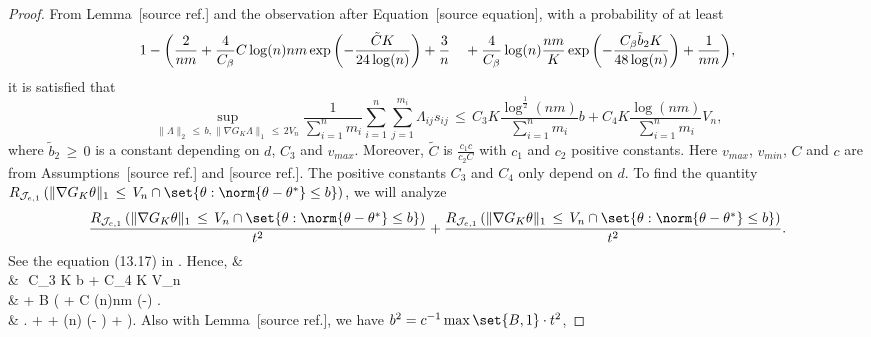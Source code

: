 \documentclass[twoside,11pt]{article}
\makeatletter
\newcommand{\discardlabel}[1]{}
\newcommand{\discardtwo}[2]{}
\newcommand{\legacyref}[1]{\textup{[source ref.]}}
\newcommand{\legacyeqref}[1]{\textup{[source equation]}}
\newenvironment{legacycomparison}{%
  \begingroup\color{legacygray}%
  \let\label\discardlabel
  \let\originallabel\discardlabel
  \let\ref\legacyref
  \let\pageref\legacyref
  \let\eqref\legacyeqref
  \let\cref\legacyref
  \let\Cref\legacyref
  \let\autoref\legacyref
  \let\aliasref\discardtwo
}{\endgroup}
\newcommand{\aliasref}[2]{%
  \@ifundefined{r@#2}{}{%
    \expandafter\let\csname r@#1\expandafter\endcsname\csname r@#2\endcsname}}
\makeatother
\begin{document}
\begin{legacycomparison}
\begin{proof}
From Lemma~\ref{Lemma_18} and the observation after Equation~\eqref{knn_temp1}, with a probability of at least
\[
1 - \bigg(\frac{2}{nm} + \frac{4}{C_{\beta}}C \log(n)nm \exp\left(-\frac{\tilde C K }{24\log(n)}\right)  + \frac{3}{n} \\
\quad + \frac{4}{C_{\beta}} \log(n) \frac{nm}{K}\exp\left(- \frac{C_{\beta} {\tilde b}_2 K}{48\log(n)}\right)  + \frac{1}{nm}\bigg),
\]
it is satisfied that
\[
\sup_{\|\varLambda\|_2 \,\leq\, b, \|\nabla{G_K} \varLambda\|_1 \,\leq\, 2V_n} \frac{1}{\sum_{i = 1}^n m_i}\sum_{i = 1}^n  \sum_{j=1}^{m_{i}} \varLambda_{ij}s_{ij}
\,\leq\, C_3  K \frac{\log^{\frac{1}{2}}(nm)}{\sum_{i = 1}^n  m_i}b + C_4  K \frac{\log(nm)}{\sum_{i = 1}^n  m_i}V_n,
\]
where \( \tilde b_2 \,\geq\, 0 \) is a constant depending on \( d \), \( C_3 \) and \( v_{max} \). Moreover, \( \tilde C \) is \( \frac{c_1c}{c_2C} \) with \( c_1 \) and \( c_2 \) positive constants.
Here \( v_{max} \), \( v_{min} \), \( C \) and \( c \) are from Assumptions~\ref{asm:m} and \ref{ass_knn}. The positive constants \( C_3 \) and \( C_4 \) only depend on \( d \).
To find the quantity $R_{\mathcal{J}_{e,1}}\left( \|\nabla{G_K} \theta\|_1 \,\leq\, V_n\cap \set{\theta: \norm{\theta-\theta^*} \leq  b}\right)$,  we will analyze
\[
\frac{ R_{\mathcal{J}_{e,1}}\left( \|\nabla{G_K} \theta\|_1 \,\leq\, V_n\cap \set{\theta: \norm{\theta-\theta^*} \leq  b}\right)}{t^2} \\
+ \frac{R_{\mathcal{J}_{e,1}}\left( \|\nabla{G_K} \theta\|_1 \,\leq\, V_n\cap \set{\theta: \norm{\theta-\theta^*} \leq  b}\right)}{t^2}.
\]
See the equation (13.17) in \cite{wainwright2019high}. 
Hence,
\bea 
& \\
&\,\leq\, C_3  K b + C_4  K V_n \\
& \quad +  B  \cdot \left( + C \log(n)nm \exp\left(-\right) \right. \\
& \left. \quad +  +  \log(n) \exp\left(- \right)  + \right).
\bea
Also with Lemma~\ref{lem_l2}, we have $b^2 = c^{-1}\max\set{B,1}\cdot t^2$,



\end{proof}
\end{legacycomparison}
\end{document}
